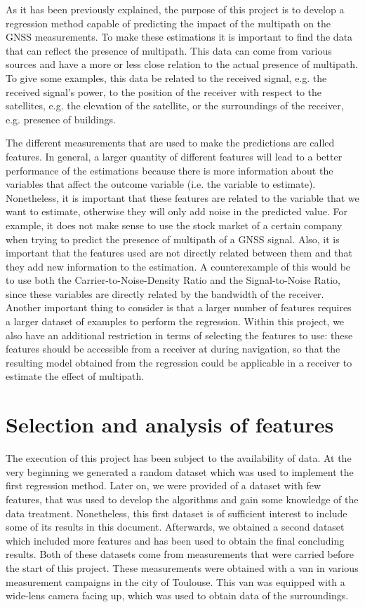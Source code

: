 \documentclass[a4paper, report, oneside, UKenglish]{memoir}
\begin{document}
As it has been previously explained, the purpose of this project is to develop a regression method capable of predicting the impact of the multipath on the GNSS measurements. To make these estimations it is important to find the data that can reflect the presence of multipath.
This data can come from various sources and have a more or less close relation to the actual presence of multipath. To give some examples, this data be related to the received signal, e.g. the received signal's power, to the position of the receiver with respect to the satellites, e.g. the elevation of the satellite, or the surroundings of the receiver, e.g. presence of buildings. 

The different measurements that are used to make the predictions are called features. In general, a larger quantity of different features will lead to a better performance of the estimations because there is more information about the variables that affect the outcome variable (i.e. the variable to estimate). Nonetheless, it is important that these features are related to the variable that we want to estimate, otherwise they will only add noise in the predicted value. For example, it does not make sense to use the stock market of a certain company when trying to predict the presence of multipath of a GNSS signal. Also, it is important that the features used are not directly related between them and that they add new information to the estimation. A counterexample of this would be to use both the Carrier-to-Noise-Density Ratio and the Signal-to-Noise Ratio, since these variables are directly related by the bandwidth of the receiver. Another important thing to consider is that a larger number of features requires a larger dataset of examples to perform the regression. Within this project, we also have an additional restriction in terms of selecting the features to use: these features should be accessible from a receiver at during navigation, so that the resulting model obtained from the regression could be applicable in a receiver to estimate the effect of multipath.

\section{Selection and analysis of features}
The execution of this project has been subject to the availability of data. At the very beginning we generated a random dataset which was used to implement the first regression method. Later on, we were provided of a dataset with few features, that was used to develop the algorithms and gain some knowledge of the data treatment. Nonetheless, this first dataset is of sufficient interest to include some of its results in this document. Afterwards, we obtained a second dataset which included more features and has been used to obtain the final concluding results. Both of these datasets come from measurements that were carried before the start of this project. These measurements were obtained with a van in various measurement campaigns in the city of Toulouse. This van was equipped with a wide-lens camera facing up, which was used to obtain data of the surroundings.
\end{document}
